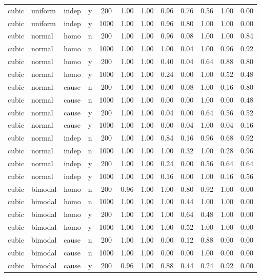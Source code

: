 \begin{longtable}{@{}lllccccccccc@{}}
cubic & uniform & indep & y & 200 & 1.00 & 1.00 & 0.96 & 0.76 & 0.56 & 1.00 & 0.00\\
cubic & uniform & indep & y & 1000 & 1.00 & 1.00 & 0.96 & 0.80 & 1.00 & 1.00 & 0.00\\
cubic & normal & homo & n & 200 & 1.00 & 1.00 & 0.96 & 0.08 & 1.00 & 1.00 & 0.84\\
cubic & normal & homo & n & 1000 & 1.00 & 1.00 & 1.00 & 0.04 & 1.00 & 0.96 & 0.92\\
cubic & normal & homo & y & 200 & 1.00 & 1.00 & 0.40 & 0.04 & 0.64 & 0.88 & 0.80\\
cubic & normal & homo & y & 1000 & 1.00 & 1.00 & 0.24 & 0.00 & 1.00 & 0.52 & 0.48\\
cubic & normal & cause & n & 200 & 1.00 & 1.00 & 0.00 & 0.08 & 1.00 & 0.16 & 0.80\\
cubic & normal & cause & n & 1000 & 1.00 & 1.00 & 0.00 & 0.00 & 1.00 & 0.00 & 0.48\\
cubic & normal & cause & y & 200 & 1.00 & 1.00 & 0.04 & 0.00 & 0.64 & 0.56 & 0.52\\
cubic & normal & cause & y & 1000 & 1.00 & 1.00 & 0.00 & 0.04 & 1.00 & 0.04 & 0.16\\
cubic & normal & indep & n & 200 & 1.00 & 1.00 & 0.84 & 0.16 & 0.96 & 0.68 & 0.92\\
cubic & normal & indep & n & 1000 & 1.00 & 1.00 & 1.00 & 0.32 & 1.00 & 0.28 & 0.96\\
cubic & normal & indep & y & 200 & 1.00 & 1.00 & 0.24 & 0.00 & 0.56 & 0.64 & 0.64\\
cubic & normal & indep & y & 1000 & 1.00 & 1.00 & 0.16 & 0.00 & 1.00 & 0.16 & 0.56\\
cubic & bimodal & homo & n & 200 & 0.96 & 1.00 & 1.00 & 0.80 & 0.92 & 1.00 & 0.00\\
cubic & bimodal & homo & n & 1000 & 1.00 & 1.00 & 1.00 & 0.44 & 1.00 & 1.00 & 0.00\\
cubic & bimodal & homo & y & 200 & 1.00 & 1.00 & 1.00 & 0.64 & 0.48 & 1.00 & 0.00\\
cubic & bimodal & homo & y & 1000 & 1.00 & 1.00 & 1.00 & 0.52 & 1.00 & 1.00 & 0.00\\
cubic & bimodal & cause & n & 200 & 1.00 & 1.00 & 0.00 & 0.12 & 0.88 & 0.00 & 0.00\\
cubic & bimodal & cause & n & 1000 & 1.00 & 1.00 & 0.00 & 0.00 & 1.00 & 0.00 & 0.00\\
cubic & bimodal & cause & y & 200 & 0.96 & 1.00 & 0.88 & 0.44 & 0.24 & 0.92 & 0.00\\

\end{longtable}
